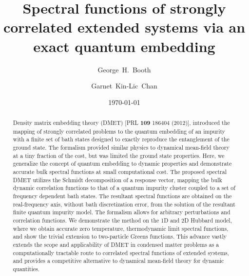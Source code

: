 \documentclass[aps,twocolumn,nobibnotes]{revtex4}
\begin{document}
\title{Spectral functions of strongly correlated extended systems via an exact quantum embedding}
\author{George~H.~Booth}
\author{Garnet~Kin-Lic~Chan}  

\begin{abstract}
Density matrix embedding theory (DMET) [PRL {\bf 109} 186404 (2012)], introduced the mapping of strongly correlated problems to the quantum embedding
of an impurity with a finite set of bath states designed to exactly reproduce the entanglement of the ground state. The formalism
provided similar physics to dynamical mean-field theory at a tiny fraction of the cost, but was limited the ground state properties.
Here, we generalize the concept of quantum embedding to dynamic properties and demonstrate accurate bulk spectral functions at small
computational cost. 
The proposed spectral DMET utilizes the Schmidt decomposition of a response vector, mapping the bulk dynamic correlation functions to that of
a quantum impurity cluster coupled to a set of frequency dependent bath states.
The resultant spectral functions are obtained on the real-frequency axis, without bath discretization error, from the solution of the resultant
finite quantum impurity model. The formalism allows for arbitrary perturbations and correlation functions.
We demonstrate the method on the 1D and 2D Hubbard model, where we obtain accurate 
zero temperature, thermodynamic limit spectral functions, and show the trivial extension to two-particle Greens functions. 
This advance vastly extends the scope and applicability 
of DMET in condensed matter problems as a computationally tractable route to correlated spectral functions of extended systems, 
and provides a competitive alternative to dynamical mean-field theory for dynamic quantities.
\end{abstract}
\date{\today}
\maketitle
\end{document}
